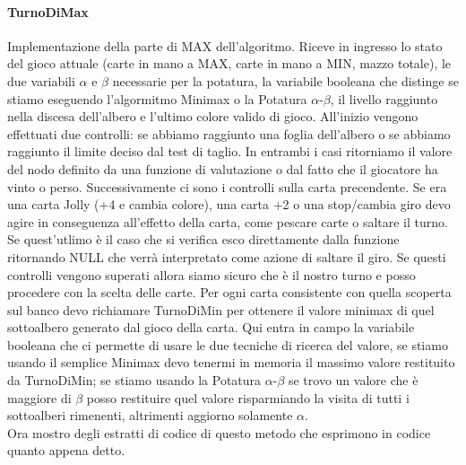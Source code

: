 		\paragraph{TurnoDiMax}
		Implementazione della parte di MAX dell'algoritmo. Riceve in ingresso lo stato del gioco attuale (carte in mano a MAX, carte in mano a MIN, mazzo totale), le due variabili $\alpha$ e $\beta$ necessarie per la potatura, la variabile booleana che distinge se stiamo eseguendo l'algormitmo Minimax o la Potatura $\alpha$-$\beta$, il livello raggiunto nella discesa dell'albero e l'ultimo colore valido di gioco. All'inizio vengono effettuati due controlli: se abbiamo raggiunto una foglia dell'albero o se abbiamo raggiunto il limite deciso dal test di taglio. In entrambi i casi ritorniamo il valore del nodo definito da una funzione di valutazione o dal fatto che il giocatore ha vinto o perso. Successivamente ci sono i controlli sulla carta precendente. Se era una carta Jolly (+4 e cambia colore), una carta +2 o una stop/cambia giro devo agire in conseguenza all'effetto della carta, come pescare carte o saltare il turno. Se quest'utlimo è il caso che si verifica esco direttamente dalla funzione ritornando NULL che verrà interpretato come azione di saltare il giro. Se questi controlli vengono superati allora siamo sicuro che è il nostro turno e posso procedere con la scelta delle carte. Per ogni carta consistente con quella scoperta sul banco devo richiamare TurnoDiMin per ottenere il valore minimax di quel sottoalbero generato dal gioco della carta. Qui entra in campo la variabile booleana che ci permette di usare le due tecniche di ricerca del valore, se stiamo usando il semplice Minimax devo tenermi in memoria il massimo valore restituito da TurnoDiMin; se stiamo usando la Potatura $\alpha$-$\beta$ se trovo un valore che è maggiore di $\beta$ posso restituire quel valore risparmiando la visita di tutti i sottoalberi rimenenti, altrimenti aggiorno solamente $\alpha$.\\
		Ora mostro degli estratti di codice di questo metodo che esprimono in codice quanto appena detto. \\
	
